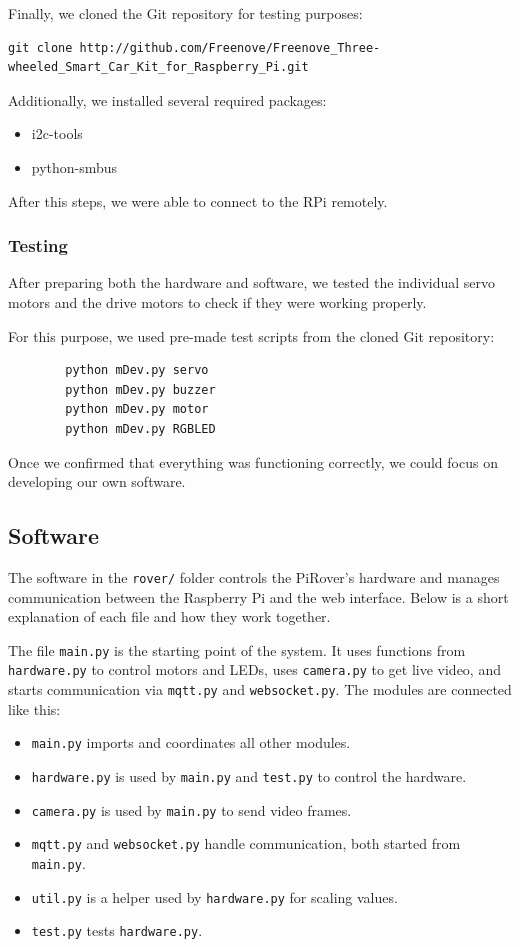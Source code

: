     Finally, we cloned the Git repository for testing purposes:
    \begin{verbatim}
git clone http://github.com/Freenove/Freenove_Three-wheeled_Smart_Car_Kit_for_Raspberry_Pi.git
    \end{verbatim}

    Additionally, we installed several required packages:
    \begin{itemize}
        \item i2c-tools
        \item python-smbus
    \end{itemize}

    After this steps, we were able to connect to the RPi remotely.

    \subsubsection{Testing}
    After preparing both the hardware and software, we tested the individual servo motors and the drive motors to check if they were working properly.

    For this purpose, we used pre-made test scripts from the cloned Git repository:
    \begin{verbatim}
        python mDev.py servo
        python mDev.py buzzer
        python mDev.py motor
        python mDev.py RGBLED
    \end{verbatim}

    Once we confirmed that everything was functioning correctly, we could focus on developing our own software.

    \subsection{Software}

    The software in the \texttt{rover/} folder controls the PiRover's hardware and manages communication between the Raspberry Pi and the web interface. Below is a short explanation of each file and how they work together.

    The file \texttt{main.py} is the starting point of the system. It uses functions from \texttt{hardware.py} to control motors and LEDs, uses \texttt{camera.py} to get live video, and starts communication via \texttt{mqtt.py} and \texttt{websocket.py}.
    The modules are connected like this:
    \begin{itemize}
        \item \texttt{main.py} imports and coordinates all other modules.
        \item \texttt{hardware.py} is used by \texttt{main.py} and \texttt{test.py} to control the hardware.
        \item \texttt{camera.py} is used by \texttt{main.py} to send video frames.
        \item \texttt{mqtt.py} and \texttt{websocket.py} handle communication, both started from \texttt{main.py}.
        \item \texttt{util.py} is a helper used by \texttt{hardware.py} for scaling values.
        \item \texttt{test.py} tests \texttt{hardware.py}.
    \end{itemize}

